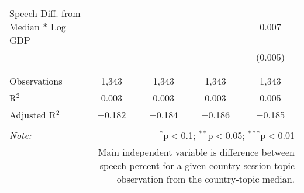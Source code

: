 \begin{table}[!htbp]
\begin{tabular}{@{\extracolsep{5pt}}lcccc}
 Speech Diff. from Median * Log GDP &  &  &  & 0.007 \\ 
  &  &  &  & (0.005) \\ 
  & & & & \\ 
\hline \\[-1.8ex] 
Observations & 1,343 & 1,343 & 1,343 & 1,343 \\ 
R$^{2}$ & 0.003 & 0.003 & 0.003 & 0.005 \\ 
Adjusted R$^{2}$ & $-$0.182 & $-$0.184 & $-$0.186 & $-$0.185 \\ 
\hline 
\hline \\[-1.8ex] 
\textit{Note:}  & \multicolumn{4}{r}{$^{*}$p$<$0.1; $^{**}$p$<$0.05; $^{***}$p$<$0.01} \\ 
 & \multicolumn{4}{r}{Main independent variable is difference between speech percent for a given country-session-topic observation from the country-topic median.} \\ 
\end{tabular} 
\end{table} 
